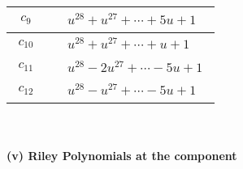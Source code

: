 \documentclass[1p]{elsarticle_modified}
\theoremstyle{definition}
\begin{document}
\begin{tabular}{m{50pt}|m{274pt}}
\hline $$\begin{aligned}c_{9}\end{aligned}$$&$\begin{aligned}
&u^{28}+u^{27}+\cdots+5 u+1
\end{aligned}$\\
\hline $$\begin{aligned}c_{10}\end{aligned}$$&$\begin{aligned}
&u^{28}+u^{27}+\cdots+u+1
\end{aligned}$\\
\hline $$\begin{aligned}c_{11}\end{aligned}$$&$\begin{aligned}
&u^{28}-2 u^{27}+\cdots-5 u+1
\end{aligned}$\\
\hline $$\begin{aligned}c_{12}\end{aligned}$$&$\begin{aligned}
&u^{28}- u^{27}+\cdots-5 u+1
\end{aligned}$\\
\hline
\end{tabular}\\~\\
\newpage\renewcommand{\arraystretch}{1}
\flushleft \textbf{(v) Riley Polynomials at the component}\newline \\
\end{document}
